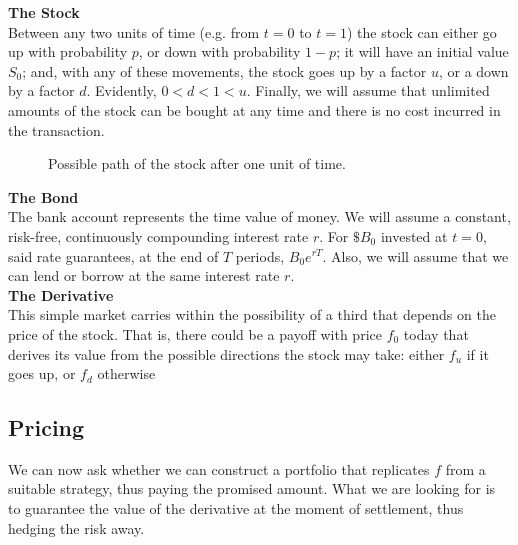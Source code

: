 \documentclass[../TGMAFFIRO.tex]{subfiles}
\begin{document}
\textbf{The Stock}\\
Between any two units of time (e.g. from $t=0$ to $t=1$) the stock can either go up with probability $p$, or down with probability $1-p$; it will have an initial value $S_0$; and, with any of these movements, the stock goes up by a factor $u$, or a down by a factor $d$. Evidently, $0 < d < 1 < u$. Finally, we will assume that unlimited amounts of the stock can be bought at any time and there is no cost incurred in the transaction.\\

\begin{figure}[h!]
\centering
{}
\caption{Possible path of the stock after one unit of time.}
\end{figure}

\textbf{The Bond}\\
The bank account represents the time value of money. We will assume a constant, risk-free, continuously compounding interest rate $r$. For $\$B_0$ invested at $t=0$, said rate guarantees, at the end of $T$ periods, $B_0 e^{rT}$. Also, we will assume that we can lend or borrow at the same interest rate $r$.\\

\textbf{The Derivative}\\
This simple market carries within the possibility of a third that depends on the price of the stock. That is, there could be a payoff with price $f_0$ today that derives its value from the possible directions the stock may take: either $f_u$ if it goes up, or $f_d$ otherwise

\begin{figure}[h!]
\centering
{}
\end{figure}


\subsection{Pricing}
We can now ask whether we can construct a portfolio that replicates $f$ from a suitable strategy, thus paying the promised amount. What we are looking for is to guarantee the value of the derivative at the moment of settlement, thus hedging the risk away.\\
\end{document}
